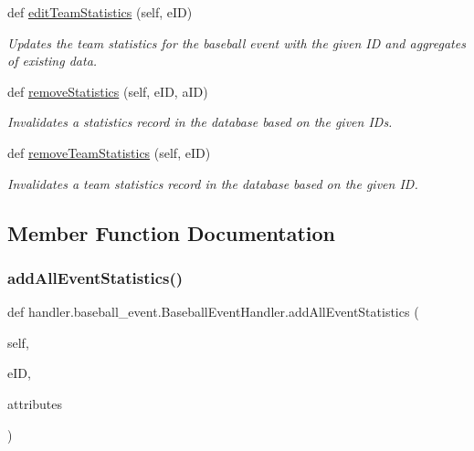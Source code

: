 \begin{DoxyCompactItemize}
def \hyperlink{classhandler_1_1baseball__event_1_1_baseball_event_handler_af199d1995fcbe5b232ac24ca5191bd5c}{edit\+Team\+Statistics} (self, e\+ID)
\begin{DoxyCompactList}\small\item\em Updates the team statistics for the baseball event with the given ID and aggregates of existing data. \end{DoxyCompactList}\item 
def \hyperlink{classhandler_1_1baseball__event_1_1_baseball_event_handler_ae6bea47416a487c4e364890221f22b0c}{remove\+Statistics} (self, e\+ID, a\+ID)
\begin{DoxyCompactList}\small\item\em Invalidates a statistics record in the database based on the given I\+Ds. \end{DoxyCompactList}\item 
def \hyperlink{classhandler_1_1baseball__event_1_1_baseball_event_handler_a41bed9256d81b41d569d888e266d79df}{remove\+Team\+Statistics} (self, e\+ID)
\begin{DoxyCompactList}\small\item\em Invalidates a team statistics record in the database based on the given ID. \end{DoxyCompactList}\end{DoxyCompactItemize}


\subsection{Member Function Documentation}
\mbox{\label{classhandler_1_1baseball__event_1_1_baseball_event_handler_ad31af1745eed5de470289edf428ac460}} 
\subsubsection{\texorpdfstring{add\+All\+Event\+Statistics()}{addAllEventStatistics()}}
{\footnotesize\ttfamily def handler.\+baseball\+\_\+event.\+Baseball\+Event\+Handler.\+add\+All\+Event\+Statistics (\begin{DoxyParamCaption}\item[{}]{self,  }\item[{}]{e\+ID,  }\item[{}]{attributes }\end{DoxyParamCaption})}



